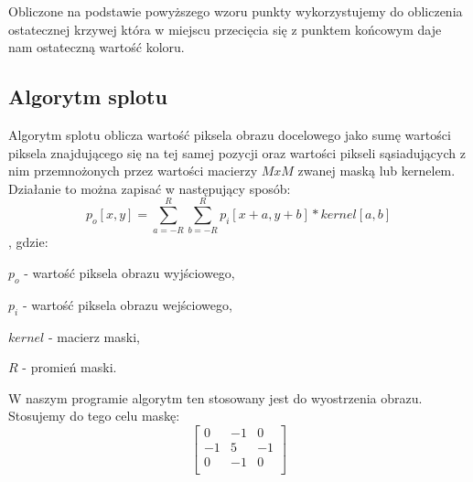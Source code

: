 \documentclass[twoside]{projektInzynierskiMS}
\begin{document}
Obliczone na podstawie powyższego wzoru punkty wykorzystujemy do obliczenia ostatecznej krzywej która w miejscu przecięcia się z punktem końcowym daje nam ostateczną wartość koloru. 

\subsection{Algorytm splotu}
Algorytm splotu oblicza wartość piksela obrazu docelowego jako sumę wartości piksela znajdującego się na tej samej pozycji oraz wartości pikseli sąsiadujących z nim przemnożonych przez wartości macierzy $MxM$ zwanej maską lub kernelem. Działanie to można zapisać w następujący sposób: 
\[p_{o}[x,y]= \sum_{a = -R}^{R}\sum_{b = -R}^{R} p_{i}[x + a, y + b]*kernel[a, b]\], gdzie:

$p_{o}$ - wartość piksela obrazu wyjściowego,

$p_{i}$ - wartość piksela obrazu wejściowego,

$kernel$ - macierz maski,

$R$ - promień maski.

W naszym programie algorytm ten stosowany jest do wyostrzenia obrazu. Stosujemy do tego celu maskę: 
\[
\begin{bmatrix}
	0 & -1 & 0\\[0.3em]
	-1 & 5 & -1\\[0.3em]
	0 & -1 & 0\\[0.3em]
\end{bmatrix}
\]
\end{document}
